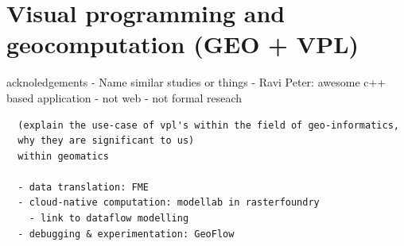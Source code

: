
\section{Visual programming and geocomputation (GEO + VPL)}
\label{sec:related-geovpl}
acknoledgements
- Name similar studies or things 
  - Ravi Peter: awesome c++ based application 
    - not web
    - not formal reseach

\begin{lstlisting}
  (explain the use-case of vpl's within the field of geo-informatics, 
  why they are significant to us) 
  within geomatics

  - data translation: FME 
  - cloud-native computation: modellab in rasterfoundry
    - link to dataflow modelling
  - debugging & experimentation: GeoFlow 
  
\end{lstlisting}




